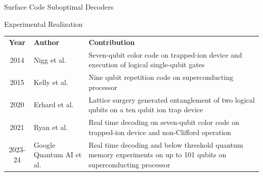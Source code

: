 \documentclass{dfki}
\begin{document}
\begin{frame}{Surface Code Suboptimal Decoders}
{\begin{textblock*}{10cm}
	\end{textblock*}
	}
	\pause
\end{frame}

\begin{frame}{Experimental Realization}
	\vspace{-18pt}
	\begin{table}[h]
		\fontsize{10pt}{10pt}\selectfont
        \renewcommand{\arraystretch}{1.5} %
		\begin{tabular}{c|p{3cm}|p{8.5cm}}
			\textbf{Year} & \textbf{Author} & \textbf{Contribution} \\
			2014 & Nigg et al. & Seven-qubit color code on trapped-ion device and execution of logical single-qubit gates \cite{nigg_quantum_2014} \\
			2015 & Kelly et al. &  Nine qubit repetition code on superconducting processor \cite{kelly_state_2015} \\
			2020 & Erhard et al. & Lattice surgery generated entanglement of two logical qubits on a ten qubit ion trap device \cite{erhard_entangling_2020} \\
			2021 & Ryan et al. & Real time decoding on seven-qubit color code on trapped-ion device and non-Clifford operation \cite{ryan-anderson_realization_2021}\\
			2023-24 & Google Quantum AI et al. & Real time decoding and below threshold quantum memory experiments on up to 101 qubits on superconducting processor \cite{google_quantum_ai_suppressing_2023, google_quantum_ai_and_collaborators_quantum_2025}
		\end{tabular}
	\end{table}
\end{frame}
\end{document}
